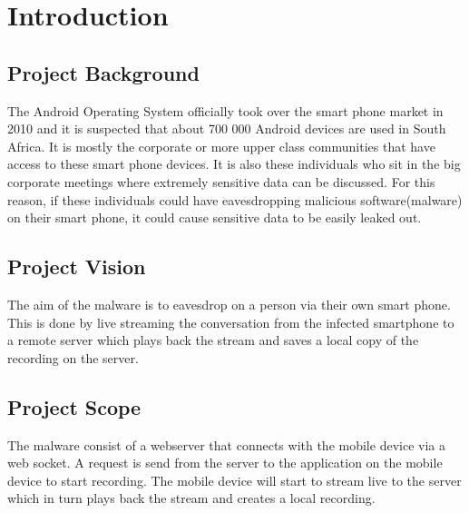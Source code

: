 \documentclass{article}
\begin{document}
 


	
	
	\newpage
	\tableofcontents
	\newpage
	\section{Introduction}
	\subsection{Project Background}

The Android Operating System officially took over the smart phone market in 2010 and it is suspected that about 700 000 Android devices are used in South Africa. It is mostly the corporate or more upper class communities that have access to these smart phone devices. It is also these individuals who sit in the big corporate meetings where extremely sensitive data can be discussed. For this reason, if these individuals could have eavesdropping malicious software(malware) on their smart phone, it could cause sensitive data to be easily leaked out.


		\subsection{Project Vision}
The aim of the malware is to eavesdrop on a person via their own smart phone. This is done by live streaming the conversation from the infected smartphone to a remote server which plays back the stream and saves a local copy of the recording on the server.
		\subsection{Project Scope}
The malware consist of a webserver that connects with the mobile device via a web socket. A request is send from the server to the application on the mobile device to start recording. The mobile device will start to stream live to the server which in turn plays back the stream and creates a local recording.

\newpage
\end{document}
